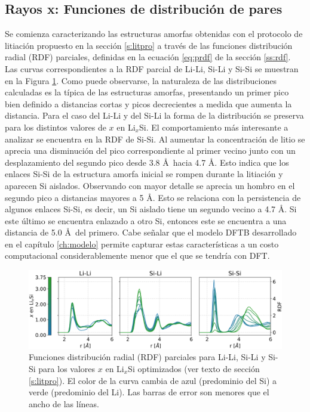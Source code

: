\subsection{Rayos x: Funciones de distribución de pares}

Se comienza caracterizando las estructuras amorfas obtenidas con el protocolo 
de litiación propuesto en la sección \ref{s:litpro} a través de las funciones 
distribución radial (RDF) parciales, definidas en la ecuación \ref{eq:prdf}
de la sección \ref{ss:rdf}. Las curvas correspondientes a la RDF parcial de 
Li-Li, Si-Li y Si-Si se muestran en la Figura \ref{fig:prdfs}. Como puede observarse,
la naturaleza de las distribuciones calculadas es la típica de las estructuras
amorfas, presentando un primer pico bien definido a distancias cortas y picos 
decrecientes a medida que aumenta la distancia. Para el caso del Li-Li y del Si-Li
la forma de la distribución se preserva para los distintos valores de $x$ en 
Li$_x$Si. El comportamiento más interesante a analizar se encuentra en la RDF de 
Si-Si. Al aumentar la concentración de litio se aprecia una disminución del pico
correspondiente al primer vecino junto con un desplazamiento del segundo pico 
desde 3.8 \AA\ hacia 4.7 \AA. Esto indica que los enlaces Si-Si de la estructura 
amorfa inicial se rompen durante la litiación y aparecen Si aislados. Observando
con mayor detalle se aprecia un hombro en el segundo pico a distancias mayores 
a 5 \AA. Esto se relaciona con la persistencia de algunos enlaces Si-Si, es decir,
un Si aislado tiene un segundo vecino a 4.7 \AA. Si este último se encuentra 
enlazado a otro Si, entonces este se encuentra a una distancia de 5.0 \AA\ del 
primero. Cabe señalar que el modelo DFTB desarrollado en el capítulo 
\ref{ch:modelo} permite capturar estas características a un costo computacional
considerablemente menor que el que se tendría con DFT.
\begin{figure}[h!]
    \centering
    \includegraphics[width=\textwidth]{Silicio/prediccion/resultados/xray/prdfs.png}
    \caption{Funciones distribución radial (RDF) parciales para Li-Li, Si-Li y Si-Si para los valores $x$ en 
    Li$_x$Si optimizados (ver texto de sección \ref{s:litpro}). El color de la curva cambia de azul (predominio del Si)
    a verde (predominio del Li). Las barras de error son menores que el ancho de 
    las líneas.}
    \label{fig:prdfs}
\end{figure}

